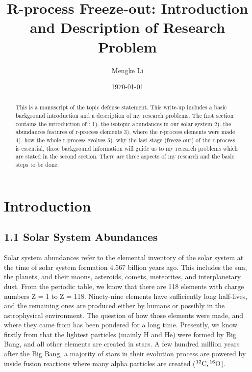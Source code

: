 \documentclass[aps,prl,preprint,groupedaddress]{revtex4}
\begin{document}
\title{R-process Freeze-out: Introduction and Description of Research Problem}

\author{Mengke Li}

\date{\today}

\begin{abstract}
This is a manuscript of the topic defense statement. This write-up includes a basic background introduction and a description of my research problems. The first section contains the introduction of : 1). the isotopic abundances in our solar system 2). the abundances features of r-process elements 3). where the r-process elements were made 4). how the whole r-process evolves 5). why the last stage (freeze-out) of the r-process is essential, those background information will guide us to my research problems which are stated in the second section. There are three aspects of my research and the basic steps to be done.

\end{abstract}
\maketitle
\section{Introduction}
\label{sec:intro}
\subsection{1.1 Solar System Abundances}
Solar system abundances refer to the elemental inventory of the solar system at the time of solar system formation 4.567 billion years ago. This includes the sun, the planets, and their moons, asteroids, comets, meteorites, and interplanetary dust\cite{Lodders2020SolarEA}. From the periodic table, we know that there are 118 elements with charge numbers Z = 1 to Z = 118. Ninety-nine elements have sufficiently long half-lives, and the remaining ones are produced either by humans or possibly in the astrophysical environment. The question of how those elements were made, and where they came from has been pondered for a long time. Presently, we know firstly from \cite{1957RvMP...29..547B} that the lightest particles (mainly \rm{H} and \rm{He}) were formed by Big Bang, and all other elements are created in stars. A few hundred million years after the Big Bang, a majority of stars in their evolution process are powered by inside fusion reactions where many alpha particles are created ($\rm{^{12}C}, \rm{^{16}O}$).\\ 
\end{document}
